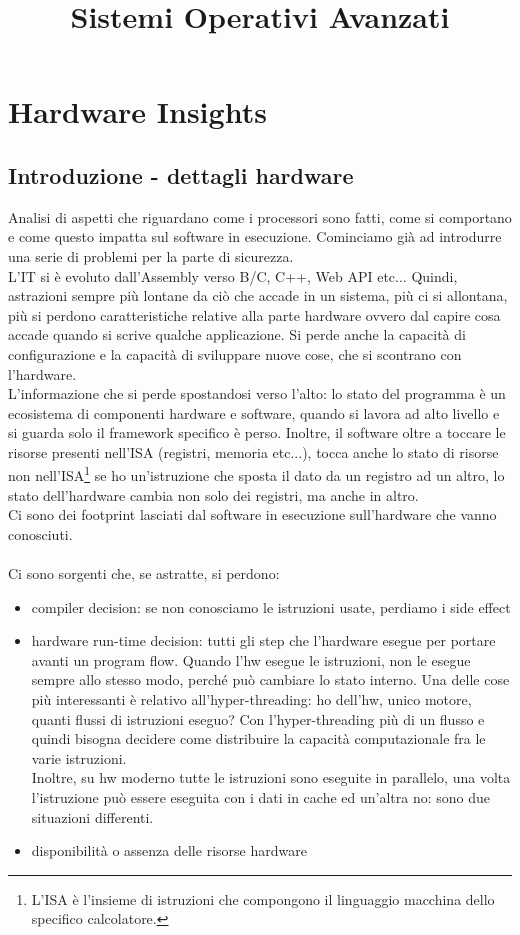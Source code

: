 \documentclass[12pt, oneside]{extbook}
\title{Sistemi Operativi Avanzati}
\begin{document}
\maketitle
\tableofcontents
\chapter{Hardware Insights}
\section{Introduzione - dettagli hardware}
Analisi di aspetti che riguardano come i processori sono fatti, come si comportano e come questo impatta sul software in esecuzione. Cominciamo già ad introdurre una serie di problemi per la parte di sicurezza.\\ L'IT si è evoluto dall'Assembly verso B/C, C++, Web API etc... Quindi, astrazioni sempre più lontane da ciò che accade in un sistema, più ci si allontana, più si perdono caratteristiche relative alla parte hardware ovvero dal capire cosa accade quando si scrive qualche applicazione. Si perde anche la capacità di configurazione e la capacità di sviluppare nuove cose, che si scontrano con l'hardware.\\ L'informazione che si perde spostandosi verso l'alto: lo stato del programma è un ecosistema di componenti hardware e software, quando si lavora ad alto livello e si guarda solo il framework specifico è perso. Inoltre, il software oltre a toccare le risorse presenti nell'ISA (registri, memoria etc...), tocca anche lo stato di risorse non nell'ISA\footnote{L'ISA è l'insieme di istruzioni che compongono il linguaggio macchina dello specifico calcolatore.} se ho un'istruzione che sposta il dato da un registro ad un altro, lo stato dell'hardware cambia non solo dei registri, ma anche in altro.\\ Ci sono dei footprint lasciati dal software in esecuzione sull'hardware che vanno conosciuti.\\\\ Ci sono sorgenti che, se astratte, si perdono:
\begin{itemize}
\item compiler decision: se non conosciamo le istruzioni usate, perdiamo i side effect
\item hardware run-time decision: tutti gli step che l'hardware esegue per portare avanti un program flow. Quando l'hw esegue le istruzioni, non le esegue sempre allo stesso modo, perché può cambiare lo stato interno. Una delle cose più interessanti è relativo all'hyper-threading: ho dell'hw, unico motore, quanti flussi di istruzioni eseguo? Con l'hyper-threading più di un flusso e quindi bisogna decidere come distribuire la capacità computazionale fra le varie istruzioni. \\ Inoltre, su hw moderno tutte le istruzioni sono eseguite in parallelo, una volta l'istruzione può essere eseguita con i dati in cache ed un'altra no: sono due situazioni differenti.
\item disponibilità o assenza delle risorse hardware
\end{itemize}
\end{document}
